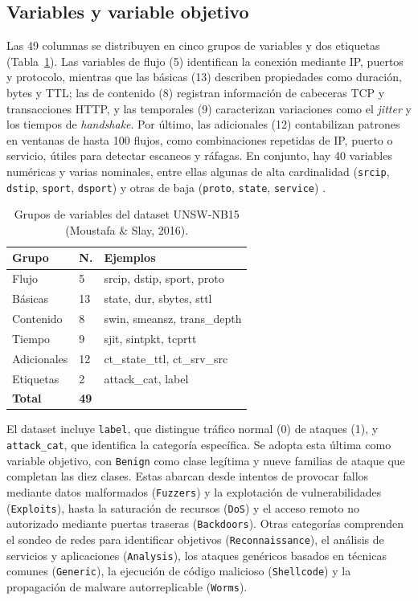 \documentclass[conference]{IEEEtran}
\begin{document}
\subsection{Variables y variable objetivo}

Las 49 columnas se distribuyen en cinco grupos de variables y dos etiquetas (Tabla~\ref{tab:grupos_variables}). Las variables de flujo (5) identifican la conexión mediante IP, puertos y protocolo, mientras que las básicas (13) describen propiedades como duración, bytes y TTL; las de contenido (8) registran información de cabeceras TCP y transacciones HTTP, y las temporales (9) caracterizan variaciones como el \textit{jitter} y los tiempos de \textit{handshake}. Por último, las adicionales (12) contabilizan patrones en ventanas de hasta 100 flujos, como combinaciones repetidas de IP, puerto o servicio, útiles para detectar escaneos y ráfagas. En conjunto, hay 40 variables numéricas y varias nominales, entre ellas algunas de alta cardinalidad (\texttt{srcip}, \texttt{dstip}, \texttt{sport}, \texttt{dsport}) y otras de baja (\texttt{proto}, \texttt{state}, \texttt{service}) \cite{moustafa2016evaluation}.

\begin{table}[H]
\centering
\caption{Grupos de variables del dataset UNSW-NB15 (Moustafa \& 
Slay, 2016).}
\label{tab:grupos_variables}
\footnotesize
\begin{tabular}{@{}p{1.6cm}p{0.7cm}p{4.3cm}@{}}
\hline
\textbf{Grupo} & \textbf{N.} & \textbf{Ejemplos} \\
\hline
Flujo & 5 & srcip, dstip, sport, proto \\
Básicas & 13 & state, dur, sbytes, sttl \\
Contenido & 8 & swin, smeansz, trans\_depth \\
Tiempo & 9 & sjit, sintpkt, tcprtt \\
Adicionales & 12 & ct\_state\_ttl, ct\_srv\_src \\
\hline
Etiquetas & 2 & attack\_cat, label \\
\hline
\textbf{Total} & \textbf{49} & \\
\hline
\end{tabular}
\end{table}

El dataset incluye \texttt{label}, que distingue tráfico normal (0) de ataques (1), y \texttt{attack\_cat}, que identifica la categoría específica. Se adopta esta última como variable objetivo, con \texttt{Benign} como clase legítima y nueve familias de ataque que completan las diez clases. Estas abarcan desde intentos de provocar fallos mediante datos malformados (\texttt{Fuzzers}) y la explotación de vulnerabilidades (\texttt{Exploits}), hasta la saturación de recursos (\texttt{DoS}) y el acceso remoto no autorizado mediante puertas traseras (\texttt{Backdoors}). Otras categorías comprenden el sondeo de redes para identificar objetivos (\texttt{Reconnaissance}), el análisis de servicios y aplicaciones (\texttt{Analysis}), los ataques genéricos basados en técnicas comunes (\texttt{Generic}), la ejecución de código malicioso (\texttt{Shellcode}) y la propagación de malware autorreplicable (\texttt{Worms}).
\end{document}
